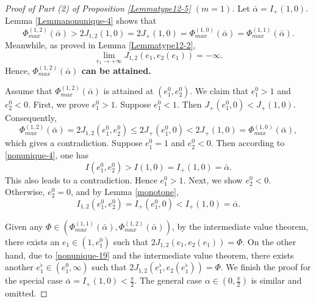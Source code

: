 \documentclass[reqno,12pt]{amsart}
\begin{document}
\begin{proof}[Proof of Part (2) of Proposition \ref{Lemmatype12-5} $(m=1)$] Let $\bar{\alpha}= I_{+}(1, 0).$
Lemma \ref{Lemmanonunique-4} shows that
  \begin{equation}\label{new2}
      \Phi_{max}^{(1, 2)}(\bar{\alpha})>2 J_{1, 2}(1,0) =2 J_{+}(1, 0)= \Phi_{max}^{(1,0)}(\bar{\alpha})=\Phi_{max}^{(1,1)}(\bar{\alpha}). 
  \end{equation}
Meanwhile, as proved in Lemma \ref{Lemmatype12-2}, 
\begin{equation}\label{nonunique-19}
    \lim_{e_1\to +\infty} J_{1, 2}(e_1, e_2(e_1)) = - \infty. 
\end{equation}
Hence, {\bf $\Phi_{max}^{(1, 2)}(\bar{\alpha})$ can be attained. }

    Assume that $\Phi_{max}^{(1, 2)}(\bar{\alpha})$ is attained at $(e_1^0, e_2^0)$. We claim that $e_1^0>1$ and $e_2^0<0$. First, we prove $e_1^0>1$. Suppose $e_1^0<1$. Then $J_{+}(e_1^0, 0) < J_{+}(1, 0).$ Consequently, 
    \begin{equation*}
        \Phi_{max}^{(1, 2)}(\bar{\alpha})=2 J_{1, 2}(e_1^0, e_2^0) \leq 2 J_{+}(e_1^0, 0)< 2 J_{+}(1, 0) =\Phi_{max}^{(1, 0)}(\bar{\alpha}),
    \end{equation*}
which gives a contradiction. Suppose $e_1^0=1$ and $e_2^0<0$. Then according to \eqref{nonunique-4}, one has
\begin{equation*}
    I (e_1^0, e_2^0)> I (1, 0) =I_{+}(1, 0)=\bar{\alpha}.
\end{equation*}
 This also leads to  a contradiction. 
Hence $e_1^0 >1$. Next, we show $e_2^0<0$. Otherwise, $e_2^0=0$, and by Lemma \ref{monotone}, 
\begin{equation*}
    I_{1, 2}(e_1^0, e_2^0) = I_{+}(e_1^0, 0) < I_{+}(1, 0) =\bar{\alpha}. 
\end{equation*}

Given any $\Phi \in (\Phi_{max}^{(1, 1)}(\bar{\alpha}), \Phi_{max}^{(1, 2)}(\bar{\alpha}))$, by the intermediate value theorem, there exists an $e_1 \in (1, e_1^0)$ such that $2J_{1, 2} (e_1, e_2(e_1)) =\Phi$.  On the other hand, due to \eqref{nonunique-19} and  the intermediate value theorem, there exists another ${e}^\flat_1 \in (e_1^0, \infty)$ such that $2J_{1, 2} ({e}^\flat_1, e_2({e}^\flat_1)) =\Phi$. We finish the proof for the special case $\bar{\alpha} = I_{+}(1, 0)<\frac{\pi}{2}$. The general case $\alpha\in(0,\frac{\pi}{2})$ is similar and omitted. 


\end{proof}
\end{document}
